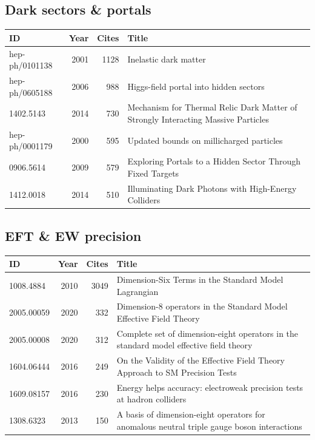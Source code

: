\documentclass[11pt,a4paper]{article}
\begin{document}
\subsection*{Dark sectors \& portals}
\begin{center}\footnotesize\begin{tabular}{@{}p{2.5cm}rr p{9cm}@{}}\toprule ID & Year & Cites & Title\\\midrule
hep-ph/0101138 & 2001 & 1128 & Inelastic dark matter\\
hep-ph/0605188 & 2006 & 988 & Higgs-field portal into hidden sectors\\
1402.5143 & 2014 & 730 & Mechanism for Thermal Relic Dark Matter of Strongly Interacting Massive Particles\\
hep-ph/0001179 & 2000 & 595 & Updated bounds on millicharged particles\\
0906.5614 & 2009 & 579 & Exploring Portals to a Hidden Sector Through Fixed Targets\\
1412.0018 & 2014 & 510 & Illuminating Dark Photons with High-Energy Colliders\\
\bottomrule\end{tabular}\end{center}
\subsection*{EFT \& EW precision}
\begin{center}\footnotesize\begin{tabular}{@{}p{2.5cm}rr p{9cm}@{}}\toprule ID & Year & Cites & Title\\\midrule
1008.4884 & 2010 & 3049 & Dimension-Six Terms in the Standard Model Lagrangian\\
2005.00059 & 2020 & 332 & Dimension-8 operators in the Standard Model Effective Field Theory\\
2005.00008 & 2020 & 312 & Complete set of dimension-eight operators in the standard model effective field theory\\
1604.06444 & 2016 & 249 & On the Validity of the Effective Field Theory Approach to SM Precision Tests\\
1609.08157 & 2016 & 230 & Energy helps accuracy: electroweak precision tests at hadron colliders\\
1308.6323 & 2013 & 150 & A basis of dimension-eight operators for anomalous neutral triple gauge boson interactions\\
\bottomrule\end{tabular}\end{center}
\end{document}
